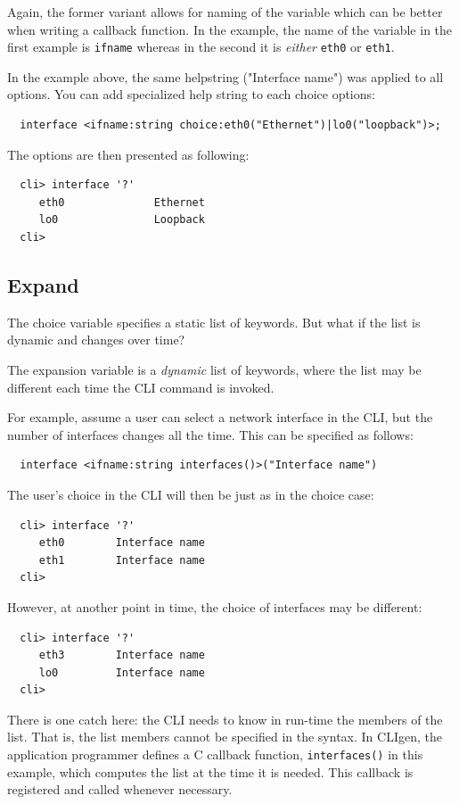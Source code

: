 \documentclass[a4paper, 10pt] {article}
\begin{document}
Again, the former variant allows for naming of the variable which can
be better when writing a callback function. In the example, the name
of the variable in the first example is {\tt ifname} whereas in the
second it is \emph{either} {\tt eth0} or {\tt eth1}.

In the example above, the same helpstring ("Interface name") was applied to all options.
You can add specialized help string to each choice options:
\begin{verbatim}
  interface <ifname:string choice:eth0("Ethernet")|lo0("loopback")>;
\end{verbatim}

The options are then presented as following:
\begin{verbatim}
  cli> interface '?'
     eth0              Ethernet
     lo0               Loopback
  cli>
\end{verbatim}

\subsection{Expand}
\label{sec:expand1}
The choice variable specifies a static list of
keywords. But what if the list is dynamic and changes over time?

The expansion variable is a \emph{dynamic} list of keywords, where the
list may be different each time the CLI command is invoked.

For example, assume a user can select a network interface in the CLI,
but the number of interfaces changes all the time. This can be
specified as follows:

\begin{verbatim}
  interface <ifname:string interfaces()>("Interface name")
\end{verbatim}
The user's choice in the CLI will then be just as in the choice case:
\begin{verbatim}
  cli> interface '?'
     eth0        Interface name
     eth1        Interface name
  cli> 
\end{verbatim}

However, at another point in time, the choice of interfaces may be different:
\begin{verbatim}
  cli> interface '?'
     eth3        Interface name
     lo0         Interface name
  cli> 
\end{verbatim}

There is one catch here: the CLI needs to know in run-time the members
of the list. That is, the list members cannot be specified in the
syntax.  In CLIgen, the application programmer defines a C callback
function, {\tt interfaces()} in this example, which computes the list
at the time it is needed. This callback is registered and called
whenever necessary.
\end{document}
